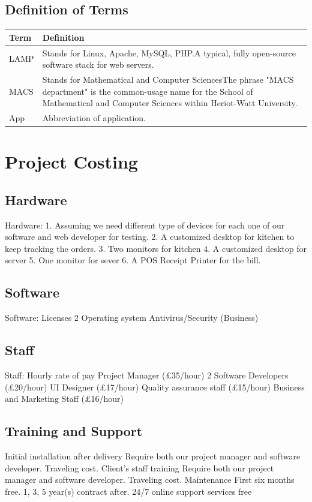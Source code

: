 \documentclass[11pt, a4paper]{report}
\begin{document}
\pagebreak

\section{Definition of Terms}
\vspace{1cm}

\begin{tabulary}{1.2\textwidth}{l L}
Term & Definition \\ \midrule

LAMP & Stands for Linux, Apache, MySQL, PHP.\newline A typical, fully open-source software stack for web servers. \\ \midrule
MACS & Stands for Mathematical and Computer Sciences\newline The phrase "MACS department" is the common-usage name for the School of Mathematical and Computer Sciences within Heriot-Watt University. \\ \midrule
App & Abbreviation of application.
\end{tabulary}

\chapter{Project Costing} 
\pagebreak 
\minitoc
\pagebreak
\section{Hardware} 
Hardware:
1.	Assuming we need different type of devices for each one of our software and web developer for testing.
2.	A customized desktop for kitchen to keep tracking the orders.
3.	Two monitors for kitchen
4.	A customized desktop for server
5.	One monitor for sever
6.	A POS Receipt Printer for the bill.
\section{Software} 
Software:
Licenses
2 Operating system
Antivirus/Security (Business)
\section{Staff} 
Staff:
Hourly rate of pay
Project Manager			(£35/hour)
2 Software Developers			(£20/hour)
UI Designer				(£17/hour)
Quality assurance staff		(£15/hour)
Business and Marketing Staff		(£16/hour)
\section{Training and Support} 
Initial installation after delivery
Require both our project manager and software developer.
Traveling cost.
Client’s staff training
Require both our project manager and software developer.
Traveling cost.
Maintenance
First six months free.
1, 3, 5 year(s) contract after.
24/7 online support services free
\end{document}
